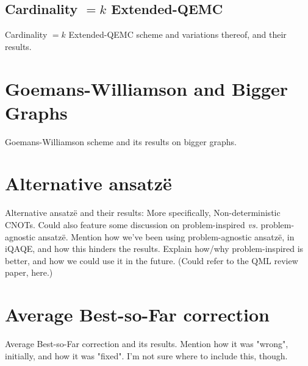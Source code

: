 \protect\subsection{Cardinality \texorpdfstring{$= k$}{= k} Extended-QEMC}
\label{subsection:Card._eq_k_Extended_QEMC}

Cardinality $= k$ Extended-QEMC scheme and variations thereof, and their results.




\section{Goemans-Williamson and Bigger Graphs}
\label{section:GW_Bigger_Graphs}

Goemans-Williamson scheme and its results on bigger graphs.






\section{Alternative ansatzë}
\label{section:Alternative_ansatzë}

Alternative ansatzë and their results: More specifically, Non-deterministic CNOTs. Could also feature some discussion on problem-inspired \textit{vs.} problem-agnostic ansatzë. Mention how we've been using problem-agnostic ansatzë, in iQAQE, and how this hinders the results. Explain how/why problem-inspired is better, and how we could use it in the future. (Could refer to the QML review paper, here.)





\section{Average Best-so-Far correction}
\label{section:Avg_BSF_correction}

Average Best-so-Far correction and its results. Mention how it was "wrong", initially, and how it was "fixed". I'm not sure where to include this, though.







